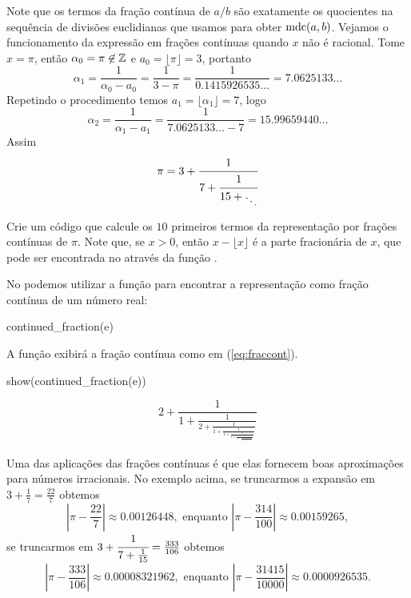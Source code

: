 Note que os termos da fração contínua de $a/b$ são
exatamente os quocientes na sequência de divisões
euclidianas que usamos para obter $\operatorname{mdc}(a,b)$.
Vejamos o funcionamento da expressão em frações
contínuas quando $x$ não é racional. Tome $x = \pi$,
então $\alpha_0 = \pi \not \in \mathbb{Z}$ e
$a_0 = \lfloor \pi \rfloor = 3$,
portanto $$\alpha_1 = \frac{1}{\alpha_0 - a_0}
= \frac{1}{3 - \pi} = \frac{1}{0.1415926535\dots} = 7.0625133\dots$$
Repetindo o procedimento temos
$a_1 = \lfloor \alpha_1\rfloor = 7$, logo $$\alpha_2
= \frac{1}{\alpha_1 - a_1} = \frac{1}{7.0625133\dots - 7} = 15.99659440\dots
$$ Assim
$$
\pi = 3 + \cfrac{1}{7+\cfrac{1}{15 + \text{\raisebox{-6pt}{$\ddots$}} }}
$$

\begin{exercise}
  Crie um código que calcule os $10$ primeiros termos da
  representação por frações contínuas de $\pi$. Note que, se
  $x>0$, então $x - \lfloor x\rfloor$ é a parte 
  fracionária de $x$, que pode ser encontrada no \sage
  através da função .
\end{exercise}
No \sage podemos utilizar a função 
para encontrar a representação como fração contínua
de um número real:
\begin{sageinput}
continued_fraction(e)                                                                              
\end{sageinput}
\begin{sageoutput}
[2; 1, 2, 1, 1, 4, 1, 1, 6, 1, 1, 8, 1, 1, 10, 1, 1, 12, 1, 1, ...]
\end{sageoutput}
A função  exibirá a fração contínua
como em (\ref{eq:fraccont}).
\begin{sageinput}
show(continued_fraction(e)) 
\end{sageinput}
$$\newcommand{\Bold}[1]{\mathbf{#1}}2
+ \frac{\displaystyle 1}{\displaystyle 1
+ \frac{\displaystyle 1}{\displaystyle 2
+ \frac{\displaystyle 1}{\displaystyle 1
+ \frac{\displaystyle 1}{\displaystyle 1
+ \frac{\displaystyle 1}{\displaystyle 4
+ \frac{\displaystyle 1}{\displaystyle 1
+ \frac{\displaystyle 1}{\displaystyle 1
+ \frac{\displaystyle 1}{\displaystyle 6
+ \frac{\displaystyle 1}{\displaystyle 1
+ \frac{\displaystyle 1}{\displaystyle \dots}}}}}}}}}}$$



Uma das aplicações das frações contínuas é que elas
fornecem boas aproximações para números irracionais. No exemplo acima,
se truncarmos a expansão em $3+\frac{1}{7} = \frac{22}{7}$ obtemos
$$
\left|\pi-\frac{22}{7} \right| \approx 0.00126448, 
\text{ enquanto }
\left|\pi - \frac{314}{100}\right| \approx 0.00159265,$$
se truncarmos em $3+\cfrac{1}{7+\frac{1}{15}}
= \frac{333}{106}$ obtemos 
$$
\left|\pi - \frac{333}{106}\right| \approx 0.00008321962,
\text{ enquanto }
\left|\pi - \frac{31415}{10000}\right| \approx0.0000926535.$$

